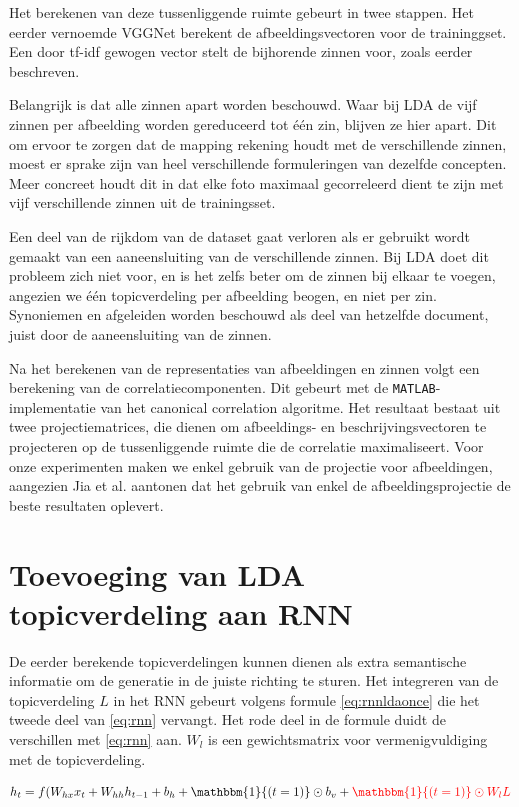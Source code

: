 Het berekenen van deze tussenliggende ruimte gebeurt in twee stappen. Het eerder vernoemde VGGNet berekent de afbeeldingsvectoren voor de traininggset. Een door tf-idf gewogen vector stelt de bijhorende zinnen voor, zoals eerder beschreven. 

Belangrijk is dat alle zinnen apart worden beschouwd. Waar bij LDA de vijf zinnen per afbeelding worden gereduceerd tot \'e\'en zin, blijven ze hier apart. Dit om ervoor te zorgen dat de mapping rekening houdt met de verschillende zinnen, moest er sprake zijn van heel verschillende formuleringen van dezelfde concepten. Meer concreet houdt dit in dat elke foto maximaal gecorreleerd dient te zijn met vijf verschillende zinnen uit de trainingsset. 

Een deel van de rijkdom van de dataset gaat verloren als er gebruikt wordt gemaakt van een aaneensluiting van de verschillende zinnen. Bij LDA doet dit probleem zich niet voor, en is het zelfs beter om de zinnen bij elkaar te voegen, angezien we \'e\'en topicverdeling per afbeelding beogen, en niet per zin. Synoniemen en afgeleiden worden beschouwd als deel van hetzelfde document, juist door de aaneensluiting van de zinnen.

Na het berekenen van de representaties van afbeeldingen en zinnen volgt een berekening van de correlatiecomponenten. Dit gebeurt met de \texttt{MATLAB}-implementatie van het canonical correlation algoritme. Het resultaat bestaat uit twee projectiematrices, die dienen om afbeeldings- en beschrijvingsvectoren te projecteren op de tussenliggende ruimte die de correlatie maximaliseert. Voor onze experimenten maken we enkel gebruik van de projectie voor afbeeldingen, aangezien Jia et al.\cite{Fernando2015} aantonen dat het gebruik van enkel de afbeeldingsprojectie de beste resultaten oplevert.


\section{Toevoeging van LDA topicverdeling aan RNN}
De eerder berekende topicverdelingen kunnen dienen als extra semantische informatie om de generatie in de juiste richting te sturen. Het integreren van de topicverdeling $L$ in het RNN gebeurt volgens formule \eqref{eq:rnnldaonce} die het tweede deel van \eqref{eq:rnn} vervangt. Het rode deel in de formule duidt de verschillen met \eqref{eq:rnn} aan. $W_l$ is een gewichtsmatrix voor vermenigvuldiging met de topicverdeling.

\begin{equation}
    h_t = f(W_{hx} x_{t} + W_{hh} h_{t-1} + b_h + \mathbbm{1}{(t=1)} \odot b_v +\color{red}{\mathbbm{1}{(t=1)} \odot W_lL}
    \color{black}
    \label{eq:rnnldaonce}
\end{equation}

